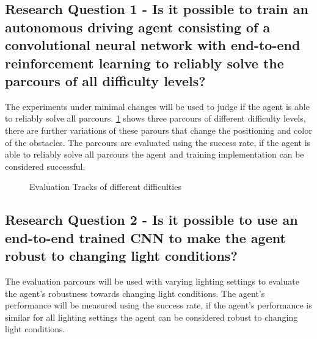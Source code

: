 \subsection{Research Question 1 - Is it possible to train an autonomous driving agent consisting of a convolutional neural network with end-to-end reinforcement learning to reliably solve the parcours of all difficulty levels?}

The experiments under minimal changes will be used to judge if the agent is able to reliably solve all parcours. \ref{fig:3tracks} shows three parcours of different difficulty levels, there are further variations of these parours that change the positioning and color of the obstacles. The parcours are evaluated using the success rate, if the agent is able to reliably solve all parcours the agent and training implementation can be considered successful.

\begin{figure}
    \centering
    \qquad
    \qquad
    \qquad
    \caption{Evaluation Tracks of different difficulties}
    \label{fig:3tracks}
\end{figure}

\subsection{Research Question 2 - Is it possible to use an end-to-end trained CNN to make the agent robust to changing light conditions?}

The evaluation parcours will be used with varying lighting settings to evaluate the agent's robustness towards changing light conditions. The agent's performance will be measured using the success rate, if the agent's performance is similar for all lighting settings the agent can be considered robust to changing light conditions.

